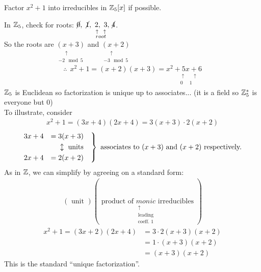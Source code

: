 \begin{example}
    Factor $x^2+1$ into irreducibles in ${\mathbb{Z}}_5[x]$ if possible. \\ \steezybreak

    \noindent In ${\mathbb{Z}}_5$, check for roots:
    $\cancel{0}, \ \cancel{1}, \underset{\substack{\uparrow \ \  \uparrow \\ root}}{\ 2, \ 3,} \ \cancel{4}$.
    \\
    So the roots are $\underset{\substack{\ \ \ \ \ \  \uparrow \\ -2 \mod 5}}{(x+3)}$ and
    $\underset{\substack{\ \ \ \ \ \  \uparrow \\ -3 \mod 5}}{(x+2)}$
    \begin{align*}
        \therefore \ \ x^2+1 = (x+2)(x+3) = \underset{\substack{\ \ \ \ \ \ \ \ \  \uparrow \ \ \ \ \ \ \uparrow \\ \ \ \ \ \ \ \ \ \  0 \ \ \ \ \ \ 1 }}{x^2 + 5x + 6}
    \end{align*}
    ${\mathbb{Z}}_5$ is Euclidean so factorization is unique up to associates... (it is a field so ${\mathbb{Z}}_5^*$ is
    everyone but $0$) \\ \steezybreak
    To illustrate, consider
    \begin{align*}
        x^2+1 = (3x+4)(2x+4) = 3(x+3)\cdot 2(x+2)
    \end{align*}
    \begin{align*}
        \begin{rcases}
            3x+4 &= 3(x+3) \ \ \ \\
            & \ \ \ \ \updownarrow \text{ units} \\
            2x+4 &= 2(x+2) \ \ \
        \end{rcases}
        \text{ associates to }(x+3) \text{ and }(x+2) \text{ respectively.}
    \end{align*}
    As in ${\mathbb{Z}}$, we can simplify by agreeing on a standard form:
    \begin{align*}
        (\text{ unit })(\text{ product of }\underset{\substack{\uparrow \\ \text{leading} \\ \text{coeff. 1}}}{monic} \text{ irreducibles })
    \end{align*}
    \begin{align*}
        x^2+1 = (3x+2)(2x+4)&= 3\cdot 2 (x+3)(x+2) \\
        &= 1\cdot (x+3)(x+2) \\
        &=(x+3)(x+2)
    \end{align*}
    This is the standard ``unique factorization''.
\end{example}
